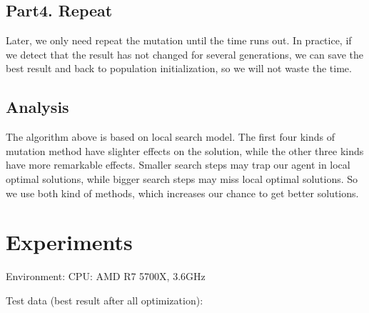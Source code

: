 \documentclass[lettersize,journal]{IEEEtran}
\begin{document}
\subsection{Part4. Repeat}

Later, we only need repeat the mutation until the time runs out. In practice, if we detect that the result has not changed for several generations, we can save the best result and back to population initialization, so we will not waste the time.

\subsection{Analysis}

The algorithm above is based on local search model. The first four kinds of mutation method have slighter effects on the solution, while the other three kinds have more remarkable effects. Smaller search steps may trap our agent in local optimal solutions, while bigger search steps may miss local optimal solutions. So we use both kind of methods, which increases our chance to get better solutions.

\section{Experiments}

Environment: CPU: AMD R7 5700X, 3.6GHz

Test data (best result after all optimization):

\end{document}
